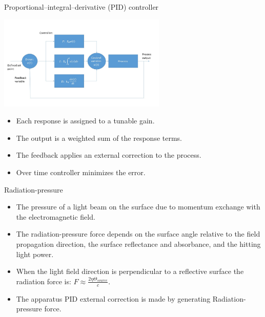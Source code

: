\documentclass{beamer}
\begin{document}
\begin{frame}{Proportional–integral–derivative (PID) controller}
	\begin{center}		
		\includegraphics[width=0.6\textwidth,keepaspectratio]{pid_diagram_powerpoint.jpg}
    \end{center}
	\begin{itemize}
	
		\item Each response is assigned to a tunable gain. 
		\item The output is a weighted sum of the response terms.
		\pause
		\item The feedback applies an external correction to the process.	
		\item Over time controller minimizes the error.
	\end{itemize}
\end{frame}
\begin{frame}{Radiation-pressure}
	\begin{itemize}
		
		\item The pressure of a light beam on the surface due to momentum exchange with the electromagnetic field.
		\pause
		\item The radiation-pressure force depends on the surface angle relative to the field propagation direction, the surface reflectance and absorbance, and the hitting light power.
		\pause
		\item When the light field direction is perpendicular to a reflective surface the radiation force is: $F  \approx\frac{2\eta\Theta_{source}}{{c}} $.
		\pause
		\item The apparatus PID external correction is made by generating Radiation-pressure force.
	\end{itemize}
\end{frame}
\end{document}
